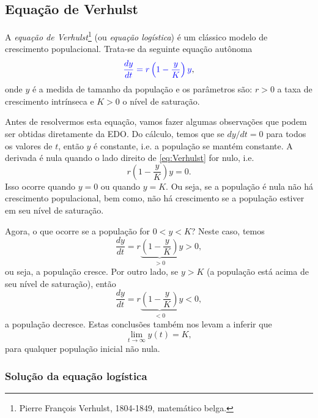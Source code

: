 \subsection{Equação de Verhulst}

A \emph{equação de Verhulst}\footnote{Pierre François Verhulst, 1804-1849, matemático belga.} (ou \emph{equação logística}) é um clássico modelo de crescimento populacional. Trata-se da seguinte equação autônoma
\begin{equation}\label{eq:Verhulst}
  {\color{blue}\frac{dy}{dt} = r\left(1 - \frac{y}{K}\right)y},
\end{equation}
onde $y$ é a medida de tamanho da população e os parâmetros são: $r>0$ a taxa de crescimento intrínseca e $K>0$ o nível de saturação.

Antes de resolvermos esta equação, vamos fazer algumas observações que podem ser obtidas diretamente da EDO. Do cálculo, temos que se $dy/dt = 0$ para todos os valores de $t$, então $y$ é constante, i.e. a população se mantém constante. A derivada é nula quando o lado direito de \eqref{eq:Verhulst} for nulo, i.e.
\begin{equation}
  r\left(1 - \frac{y}{K}\right)y = 0.
\end{equation}
Isso ocorre quando $y = 0$ ou quando $y=K$. Ou seja, se a população é nula não há crescimento populacional, bem como, não há crescimento se a população estiver em seu nível de saturação.

Agora, o que ocorre se a população for $0 < y < K$? Neste caso, temos
\begin{equation}
  \frac{dy}{dt} = r\underbrace{\left(1 - \frac{y}{K}\right)}_{>0}y > 0,
\end{equation}
ou seja, a população cresce. Por outro lado, se $y > K$ (a população está acima de seu nível de saturação), então
\begin{equation}
  \frac{dy}{dt} = r\underbrace{\left(1 - \frac{y}{K}\right)}_{<0}y < 0,
\end{equation}
a população decresce. Estas conclusões também nos levam a inferir que
\begin{equation}
  \lim_{t\to\infty} y(t) = K,
\end{equation}
para qualquer população inicial não nula.

\subsubsection{Solução da equação logística}

